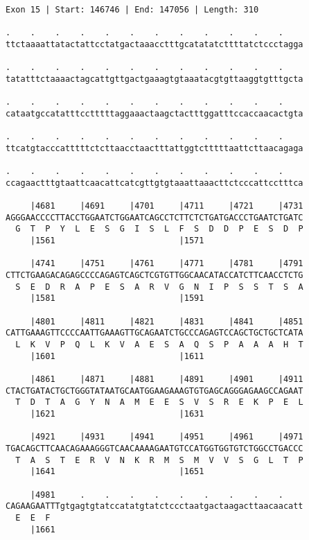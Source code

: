 \documentclass{article}
\begin{document}
\newpage
\begin{Verbatim}
Exon 15 | Start: 146746 | End: 147056 | Length: 310
 
.    .    .    .    .    .    .    .    .    .    .    .    
ttctaaaattatactattcctatgactaaacctttgcatatatcttttatctccctagga
  
.    .    .    .    .    .    .    .    .    .    .    .    
tatatttctaaaactagcattgttgactgaaagtgtaaatacgtgttaaggtgtttgcta
  
.    .    .    .    .    .    .    .    .    .    .    .    
cataatgccatatttcctttttaggaaactaagctactttggatttccaccaacactgta
  
.    .    .    .    .    .    .    .    .    .    .    .    
ttcatgtacccatttttctcttaacctaactttattggtctttttaattcttaacagaga
  
.    .    .    .    .    .    .    .    .    .    .    .    
ccagaactttgtaattcaacattcatcgttgtgtaaattaaacttctcccattcctttca
  
     |4681     |4691     |4701     |4711     |4721     |4731
AGGGAACCCCTTACCTGGAATCTGGAATCAGCCTCTTCTCTGATGACCCTGAATCTGATC
  G  T  P  Y  L  E  S  G  I  S  L  F  S  D  D  P  E  S  D  P
     |1561                         |1571                    
  
     |4741     |4751     |4761     |4771     |4781     |4791
CTTCTGAAGACAGAGCCCCAGAGTCAGCTCGTGTTGGCAACATACCATCTTCAACCTCTG
  S  E  D  R  A  P  E  S  A  R  V  G  N  I  P  S  S  T  S  A
     |1581                         |1591                    
  
     |4801     |4811     |4821     |4831     |4841     |4851
CATTGAAAGTTCCCCAATTGAAAGTTGCAGAATCTGCCCAGAGTCCAGCTGCTGCTCATA
  L  K  V  P  Q  L  K  V  A  E  S  A  Q  S  P  A  A  A  H  T
     |1601                         |1611                    
  
     |4861     |4871     |4881     |4891     |4901     |4911
CTACTGATACTGCTGGGTATAATGCAATGGAAGAAAGTGTGAGCAGGGAGAAGCCAGAAT
  T  D  T  A  G  Y  N  A  M  E  E  S  V  S  R  E  K  P  E  L
     |1621                         |1631                    
  
     |4921     |4931     |4941     |4951     |4961     |4971
TGACAGCTTCAACAGAAAGGGTCAACAAAAGAATGTCCATGGTGGTGTCTGGCCTGACCC
  T  A  S  T  E  R  V  N  K  R  M  S  M  V  V  S  G  L  T  P
     |1641                         |1651                    
  
     |4981     .    .    .    .    .    .    .    .    .    
CAGAAGAATTTgtgagtgtatccatatgtatctccctaatgactaagacttaacaacatt
  E  E  F                                                   
     |1661                                                  
  

\end{Verbatim}
\end{document}
